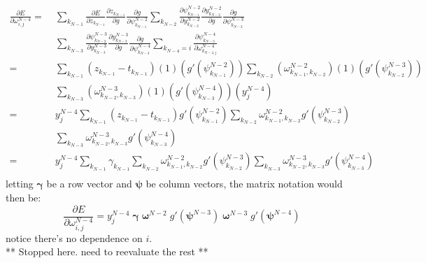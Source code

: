 \documentclass{article}
\begin{document}
\begin{equation} \label{eq:derive_du_nm4}
\begin{aligned}
\frac{\partial E}{\partial \omega_{i,j}^{N-4}} =& \;
%
\sum_{k_{N-1}}
\frac{\partial E}{\partial z_{k_{N-1}}}
\frac{\partial z_{k_{N-1}}}{\partial g}
\frac{\partial g}{\partial \psi_{k_{N-1}}^{N-2}}
%
\sum_{k_{N-2}}
\frac{\partial \psi_{k_{N-1}}^{N-2}}{\partial y_{k_{N-2}}^{N-2}}
\frac{\partial y_{k_{N-2}}^{N-2}}{\partial g}
\frac{\partial g}{\partial \psi_{k_{N-2}}^{N-3}} \\
%
& \;\sum_{k_{N-3}}
\frac{\partial \psi_{k_{N-2}}^{N-3}}{\partial y_{k_{N-3}}^{N-3}}
\frac{\partial y_{k_{N-3}}^{N-3}}{\partial g}
\frac{\partial g}{\partial \psi_{k_{N-3}}^{N-4}}
%
\sum_{k_{N-4}=i}
\frac{\partial \psi_{k_{N-3}}^{N-4}}{\partial \omega_{k_{N-4,j}}^{N-4}} \\
=& \; \sum_{k_{N-1}}
\left( z_{k_{N-1}} - t_{k_{N-1}} \right)
%
(1)
\left( g' \left( \psi_{k_{N-1}}^{N-2} \right) \right)
%
\sum_{k_{N-2}}
\left( \omega_{k_{N-1},k_{N-2}}^{N-2} \right)
(1)
\left( g' (\psi_{k_{N-2}}^{N-3}) \right) \\
%
& \;\sum_{k_{N-3}}
\left( \omega_{k_{N-2},k_{N-3}}^{N-3} \right)
(1)
\left( g' (\psi_{k_{N-3}}^{N-4}) \right)
%
\left( y_j^{N-4} \right) \\
=& \; y_j^{N-4} \sum_{k_{N-1}}
\left( z_{k_{N-1}} - t_{k_{N-1}} \right)
g' \left( \psi_{k_{N-1}}^{N-2} \right)
%
\sum_{k_{N-2}}
\omega_{k_{N-1},k_{N-2}}^{N-2}
g' \left( \psi_{k_{N-2}}^{N-3} \right) \\
%
& \;\sum_{k_{N-3}}
\omega_{k_{N-2},k_{N-3}}^{N-3}
g' \left( \psi_{k_{N-3}}^{N-4} \right) \\
=& \; y_j^{N-4} \sum_{k_{N-1}}
\gamma_{k_{N-1}}
%
\sum_{k_{N-2}}
\omega_{k_{N-1},k_{N-2}}^{N-2}
g' \left( \psi_{k_{N-2}}^{N-3} \right)
%
\sum_{k_{N-3}}
\omega_{k_{N-2},k_{N-3}}^{N-3}
g' \left( \psi_{k_{N-3}}^{N-4} \right) \\
\end{aligned}
\end{equation}
%
letting $\bm{\gamma}$ be a row vector and $\bm{\psi}$ be column vectors, the matrix notation would then be:
%
\begin{equation} \label{eq:derive_du_nm4_matrix}
\frac{\partial E}{\partial \omega_{i,j}^{N-4}} =
y_j^{N-4} \;
\bm{\gamma} \;
\bm{\omega}^{N-2} \;
g' (\bm{\psi}^{N-3}) \;
\bm{\omega}^{N-3} \;
g' (\bm{\psi}^{N-4})
\end{equation}
%
notice there's no dependence on $i$. \\
%
** Stopped here. need to reevaluate the rest ** \\
\end{document}
